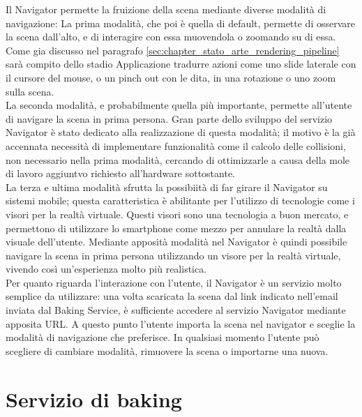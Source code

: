 Il Navigator permette la fruizione della scena mediante diverse modalità di navigazione:
La prima modalità, che poi è quella di default, permette di osservare la scena dall’alto, e di interagire con essa muovendola o zoomando su di essa. Come gia discusso nel paragrafo \ref{sec:chapter_stato_arte_rendering_pipeline}  sarà compito dello stadio Applicazione tradurre azioni come uno slide laterale con il cursore del mouse, o un pinch out con le dita, in una rotazione o uno zoom sulla scena.
\\
La seconda modalità, e probabilmente quella più importante, permette all’utente di navigare la scena in prima persona. Gran parte dello sviluppo del servizio Navigator è stato dedicato alla realizzazione di questa modalità; il motivo è la già accennata necessità di implementare funzionalità come il calcolo delle collisioni, non necessario nella prima modalità, cercando di ottimizzarle a causa della mole di lavoro aggiuntvo richiesto all’hardware sottostante.
\\
La terza e ultima modalità sfrutta la possibiità di far girare il Navigator su sistemi mobile; questa caratteristica è abilitante per l’utilizzo di tecnologie come i visori per la realtà virtuale. Questi visori sono una tecnologia a buon mercato, e permettono di utilizzare lo smartphone come mezzo per annulare la realtà dalla visuale dell’utente. Mediante apposità modalità nel Navigator è quindi possibile navigare la scena in prima persona utilizzando un visore per la realtà virtuale, vivendo così un’esperienza molto più realistica. 
\\
Per quanto riguarda l’interazione con l’utente, il Navigator è un servizio molto semplice da utilizzare: una volta scaricata la scena dal link indicato nell’email inviata dal Baking Service, è sufficiente accedere al servizio Navigator mediante apposita URL. A questo punto l’utente importa la scena nel navigator e sceglie la modalità di navigazione che preferisce. In qualsiasi momento l’utente può scegliere di cambiare modalità, rimuovere la scena o importarne una nuova.

\section{Servizio di baking}
\label{sec:chapter_architettura_sistema_il_servizio_baking}

